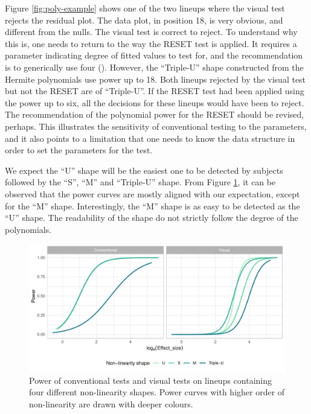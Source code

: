 \documentclass[]{interact}
\theoremstyle{plain}%
\theoremstyle{definition}
\theoremstyle{remark}
\begin{document}
Figure \ref{fig:poly-example} shows one of the two lineups where the
visual test rejects the residual plot. The data plot, in position 18, is
very obvious, and different from the nulls. The visual test is correct
to reject. To understand why this is, one needs to return to the way the
RESET test is applied. It requires a parameter indicating degree of
fitted values to test for, and the recommendation is to generically use
four (\citet{ramsey_tests_1969}). However, the ``Triple-U'' shape
constructed from the Hermite polynomials use power up to 18. Both
lineups rejected by the visual test but not the RESET are of
``Triple-U''. If the RESET test had been applied using the power up to
six, all the decisions for these lineups would have been to reject. The
recommendation of the polynomial power for the RESET should be revised,
perhaps. This illustrates the sensitivity of conventional testing to the
parameters, and it also points to a limitation that one needs to know
the data structure in order to set the parameters for the test.

We expect the ``U'' shape will be the easiest one to be detected by
subjects followed by the ``S'', ``M'' and ``Triple-U'' shape. From
Figure \ref{fig:poly-power-j}, it can be observed that the power curves
are mostly aligned with our expectation, except for the ``M'' shape.
Interestingly, the ``M'' shape is as easy to be detected as the ``U''
shape. The readability of the shape do not strictly follow the degree of
the polynomials.

\begin{figure}

{\centering \includegraphics[width=1\linewidth]{paper_comparison_files/figure-latex/poly-power-j-1} 

}

\caption{Power of conventional tests and visual tests on lineups containing four different non-linearity shapes. Power curves with higher order of non-linearity are drawn with deeper colours.}\label{fig:poly-power-j}
\end{figure}
\end{document}
